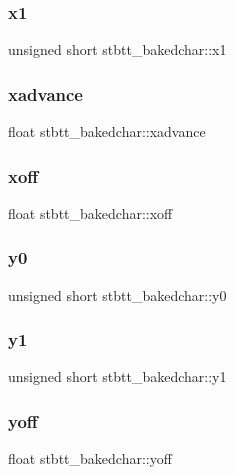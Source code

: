 \subsubsection{\texorpdfstring{x1}{x1}}
{\footnotesize\ttfamily unsigned short stbtt\+\_\+bakedchar\+::x1}

\hypertarget{structstbtt__bakedchar_ad77b35d1a849d9eb7edb91df05b10536}{}\label{structstbtt__bakedchar_ad77b35d1a849d9eb7edb91df05b10536} 
\subsubsection{\texorpdfstring{xadvance}{xadvance}}
{\footnotesize\ttfamily float stbtt\+\_\+bakedchar\+::xadvance}

\hypertarget{structstbtt__bakedchar_a0708a6588a2768b68a3ae59002944b7c}{}\label{structstbtt__bakedchar_a0708a6588a2768b68a3ae59002944b7c} 
\subsubsection{\texorpdfstring{xoff}{xoff}}
{\footnotesize\ttfamily float stbtt\+\_\+bakedchar\+::xoff}

\hypertarget{structstbtt__bakedchar_aec4def12c086e0038ba32ff33ee78644}{}\label{structstbtt__bakedchar_aec4def12c086e0038ba32ff33ee78644} 
\subsubsection{\texorpdfstring{y0}{y0}}
{\footnotesize\ttfamily unsigned short stbtt\+\_\+bakedchar\+::y0}

\hypertarget{structstbtt__bakedchar_ac831dc667f6c39b5d22740c6cbd5bc3f}{}\label{structstbtt__bakedchar_ac831dc667f6c39b5d22740c6cbd5bc3f} 
\subsubsection{\texorpdfstring{y1}{y1}}
{\footnotesize\ttfamily unsigned short stbtt\+\_\+bakedchar\+::y1}

\hypertarget{structstbtt__bakedchar_aba01393e52d1c6f4ce86a8b51e498bb4}{}\label{structstbtt__bakedchar_aba01393e52d1c6f4ce86a8b51e498bb4} 
\subsubsection{\texorpdfstring{yoff}{yoff}}
{\footnotesize\ttfamily float stbtt\+\_\+bakedchar\+::yoff}

